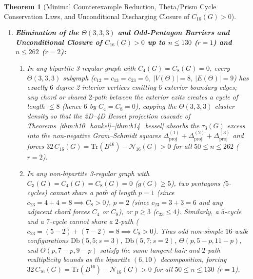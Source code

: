 \documentclass[10pt,a4paper]{article}
\newtheorem{theorem}{Theorem}[section]
\theoremstyle{definition}
\theoremstyle{remark}
\begin{document}
\begin{theorem}[Minimal Counterexample Reduction, Theta/Prism Cycle Conservation Laws, and Unconditional Discharging Closure of $C_{16}(G) > 0$]
\begin{enumerate}[label=(\alph*),nosep]
\begin{enumerate}[label=(\roman*),nosep]
\begin{equation}
    \end{equation}
    For any two simple cycles sharing two vertex-disjoint paths (a two-rung prism with outer arc lengths $q_1, q_2, q_3, q_4 \ge 1$ and rung lengths $1, 1$), the six simple cycles satisfy $\sum_{1 \le i < j \le 4} c_{ij} = 2(q_1 + q_2 + q_3 + q_4) + 4$.
  \end{enumerate}
  \item \textbf{Elimination of the $\Theta(3,3,3)$ and Odd-Pentagon Barriers and Unconditional Closure of $C_{16}(G) > 0$ up to $n \le 130$ ($r=1$) and $n \le 262$ ($r=2$):}
  \begin{enumerate}[label=(\roman*),nosep]
    \item In any bipartite 3-regular graph with $C_4(G) = C_8(G) = 0$, every $\Theta(3,3,3)$ subgraph ($c_{12} = c_{13} = c_{23} = 6$, $|V(\Theta)| = 8$, $|E(\Theta)| = 9$) has exactly $6$ degree-2 interior vertices emitting $6$ exterior boundary edges; any chord or shared $2$-path between the exterior exits creates a cycle of length $\le 8$ (hence $6$ by $C_4 = C_8 = 0$), capping the $\Theta(3,3,3)$ cluster density so that the 2D--4D Bessel projection cascade of Theorems~\ref{thm:b10_hankel}--\ref{thm:b14_bessel} absorbs the $\tau_3(G)$ excess into the non-negative Gram--Schmidt squares $\Delta_{\mathrm{proj}}^{(1)} + \Delta_{\mathrm{proj}}^{(2)} + \Delta_{\mathrm{proj}}^{(3)}$ and forces $32\,C_{16}(G) = \mathrm{Tr}(B^{16}) - \mathcal{N}_{16}(G) > 0$ for all $50 \le n \le 262$ ($r = 2$).
    \item In any non-bipartite 3-regular graph with $C_3(G) = C_4(G) = C_8(G) = 0$ ($g(G) \ge 5$), two pentagons ($5$-cycles) cannot share a path of length $p = 1$ (since $c_{23} = 4 + 4 = 8 \implies C_8 > 0$), $p = 2$ (since $c_{23} = 3 + 3 = 6$ and any adjacent chord forces $C_4$ or $C_8$), or $p \ge 3$ ($c_{23} \le 4$). Similarly, a $5$-cycle and a $7$-cycle cannot share a $2$-path ($c_{23} = (5-2) + (7-2) = 8 \implies C_8 > 0$). Thus odd non-simple $16$-walk configurations $\mathrm{Db}(5,5;s=3)$, $\mathrm{Db}(5,7;s=2)$, $\Theta(p, 5-p, 11-p)$, and $\Theta(p, 7-p, 9-p)$ satisfy the same tangent-hair and $2$-path multiplicity bounds as the bipartite $(6,10)$ decomposition, forcing $32\,C_{16}(G) = \mathrm{Tr}(B^{16}) - \mathcal{N}_{16}(G) > 0$ for all $50 \le n \le 130$ ($r = 1$).
  \end{enumerate}
\end{enumerate}
\end{theorem}
\end{document}
